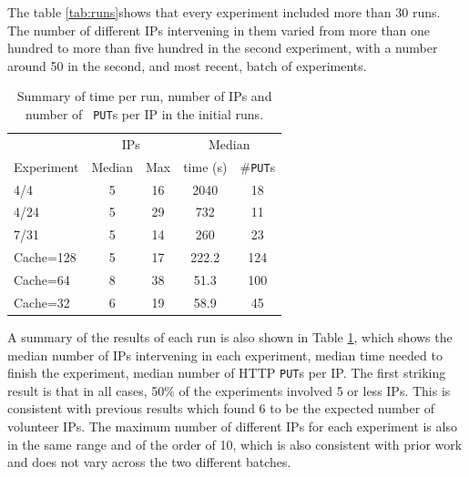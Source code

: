 \documentclass[letterpaper]{article}
\begin{document}
The table \ref{tab:runs}shows that every experiment included more than 30 runs. The
number of different IPs intervening in them varied from more than one
hundred to more than five hundred in the second experiment, with a
number around 50 in the second, and most recent, batch of experiments. 
%
\begin{table}[htb]
\caption{Summary of time per run, number of IPs and number of {\tt
    PUT}s per IP in the initial runs. \label{tab:summary:os}}
\begin{center}
\begin{tabular}{l|cccc}
\hline
     & \multicolumn{2}{c}{IPs} & \multicolumn{2}{c}{Median} \\
Experiment & Median & Max & time (s) &  \#{\tt  PUT}s \\
\hline
4/4 & 5 & 16 & 2040 & 18   \\
4/24 &  5 & 29 & 732 & 11  \\
7/31 & 5 & 14 & 260 & 23   \\
\hline
Cache=128 & 5 & 17 & 222.2 & 124 \\ 
Cache=64 & 8 & 38 & 51.3 & 100 \\
Cache=32 & 6 & 19 & 58.9 & 45 \\
\hline
\end{tabular}
\end{center}
\end{table}
%

A summary of the results of each run is also shown in Table
\ref{tab:summary:os}, which shows the median number of IPs
intervening in each experiment,  median time needed
to finish the experiment, median number of HTTP {\tt PUT}s per IP. The
first striking result is that in all cases, 50\% of the 
experiments involved 5 or less IPs. This is consistent with previous results
\citep{DBLP:conf/gecco/GuervosG15} which found 6 to be
the expected number of volunteer IPs. The
maximum number of different IPs for each experiment is also in the
same range and of the order of 10, which is also consistent with
prior work and does not vary across the two different batches. 
\end{document}
